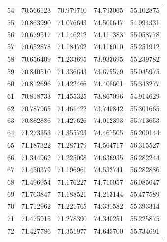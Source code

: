 \begin{table}
\begin{tabular}{rrrrr}
54 & 70.566123 & 70.979710 & 74.793065 & 55.102875 \\
55 & 70.863990 & 71.076643 & 74.500647 & 54.994331 \\
56 & 70.679517 & 71.146212 & 74.111383 & 55.058778 \\
57 & 70.652878 & 71.184792 & 74.116010 & 55.251912 \\
58 & 70.656409 & 71.233695 & 73.933695 & 55.239782 \\
59 & 70.840510 & 71.336643 & 73.675579 & 55.045975 \\
60 & 70.812696 & 71.422466 & 74.408601 & 55.348277 \\
61 & 70.818733 & 71.455325 & 73.867096 & 54.914629 \\
62 & 70.787965 & 71.461422 & 73.740842 & 55.301665 \\
63 & 70.882886 & 71.427626 & 74.012393 & 55.713653 \\
64 & 71.273353 & 71.355793 & 74.467505 & 56.200144 \\
65 & 71.187322 & 71.287179 & 74.564717 & 56.315527 \\
66 & 71.344962 & 71.225098 & 74.636935 & 56.282244 \\
67 & 71.450379 & 71.196961 & 74.532741 & 56.282886 \\
68 & 71.496954 & 71.176227 & 74.710057 & 56.085647 \\
69 & 71.763847 & 71.188521 & 74.213144 & 55.477589 \\
70 & 71.712962 & 71.221765 & 74.331582 & 55.393314 \\
71 & 71.475915 & 71.278390 & 74.340251 & 55.225875 \\
72 & 71.427786 & 71.351977 & 74.645700 & 55.734691 \\
\bottomrule
\end{tabular}
\end{table}
